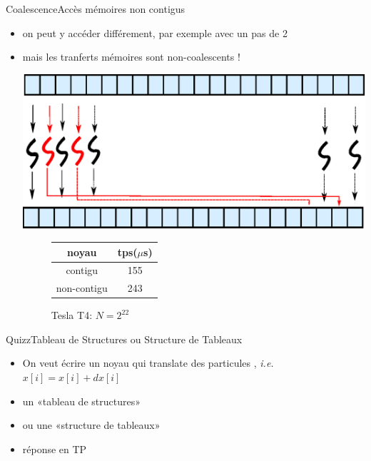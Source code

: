 \documentclass[11pt,mathserif]{beamer}
\newcommand{\galde}{\faQuestion}
\newcommand{\hand}{\faHandORight}
\newcommand{\kontuz}{\faExclamationTriangle}
\newcommand{\pozik}{\faSmileO}
\newcommand{\adibi}{\faCommentO}
\newcommand{\mylang}{c}
\newcommand{\extlang}{c}
\newcommand{\extcu}{cu}
\newcommand{\mylang}{fortran}
\newcommand{\extlang}{f90}
\newcommand{\extcu}{cuf}
\newcommand{\includeSrc}[1]{}
\newcommand{\includeSrcCu}[1]{}
\begin{document}
\begin{frame}{Coalescence}{Accès mémoires non contigus}
  \begin{itemize}[<+->]
    \item[\adibi] on peut y accéder différement, par exemple avec un pas de 2
\begin{center}
  \includeSrcCu{code/scaleFlipAndHalf}
\end{center}
    \item[\kontuz] mais les tranferts mémoires sont non-coalescents !
\begin{minipage}[c]{0.49\linewidth}
  \includegraphics[width=0.9\linewidth]{fig/coalScaleHalf.eps}
\end{minipage}
\begin{minipage}[r]{0.49\linewidth}
  \vspace{1cm}
  \begin{figure}[h]
    \begin{tabular}{|c|c|}
      \hline
      noyau & tps($\mu$s)  \\
      \hline
      contigu & 155 \\
      non-contigu  & 243 \\
      \hline
    \end{tabular}
    \caption{Tesla T4: $N = 2^{22}$}
  \end{figure}
\end{minipage}
  \end{itemize}
\end{frame}

\begin{frame}{Quizz}{Tableau de Structures ou Structure de Tableaux}
  \begin{itemize}[<+->]
    \item[\adibi] On veut écrire un noyau qui translate des particules , {\em i.e. }  $x[i] = x[i] + dx[i]$
    \item[\galde] un «tableau de structures»
\begin{center}
  \includeSrc{code/AOS}
\end{center}
    \item[\galde] ou une «structure de tableaux»
\begin{center}
  \includeSrc{code/SOA}
\end{center}
  \item[\hand] réponse en TP \pozik
  \end{itemize}
\end{frame}
\end{document}
